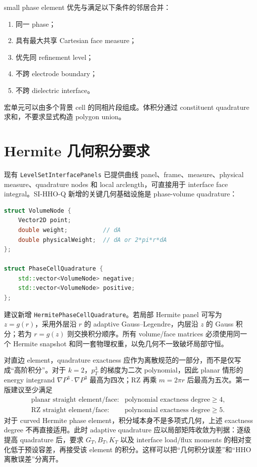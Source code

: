\documentclass[UTF8,a4paper,11pt]{ctexart}
\begin{document}
small phase element 优先与满足以下条件的邻居合并：
\begin{enumerate}[label=(\roman*)]
  \item 同一 phase；
  \item 具有最大共享 Cartesian face measure；
  \item 优先同 refinement level；
  \item 不跨 electrode boundary；
  \item 不跨 dielectric interface。
\end{enumerate}
宏单元可以由多个背景 cell 的同相片段组成。体积分通过 constituent quadrature 求和，不要求显式构造 polygon union。

\section{Hermite 几何积分要求}

现有 \texttt{LevelSetInterfacePanels} 已提供曲线 panel、frame、measure、physical measure、quadrature nodes 和 local arclength，可直接用于 interface face integral。SI-HHO-Q 新增的关键几何基础设施是 phase-volume quadrature：
\begin{lstlisting}[language=C++]
struct VolumeNode {
    Vector2D point;
    double weight;          // dA
    double physicalWeight;  // dA or 2*pi*r*dA
};

struct PhaseCellQuadrature {
    std::vector<VolumeNode> negative;
    std::vector<VolumeNode> positive;
};
\end{lstlisting}
建议新增 \texttt{HermitePhaseCellQuadrature}。若局部 Hermite panel 可写为 \(z=g(r)\)，采用外层沿 \(r\) 的 adaptive Gauss--Legendre，内层沿 \(z\) 的 Gauss 积分；若为 \(r=g(z)\) 则交换积分顺序。所有 volume/face matrices 必须使用同一个 Hermite snapshot 和同一套物理权重，以免几何不一致破坏局部守恒。

对直边 element，quadrature exactness 应作为离散规范的一部分，而不是仅写成“高阶积分”。对于 \(k=2\)，\(p_T^3\) 的梯度为二次 polynomial，因此 planar 情形的 energy integrand \(\nabla P^3\cdot\nabla P^3\) 最高为四次；RZ 再乘 \(m=2\pi r\) 后最高为五次。第一版建议至少满足
\[
\boxed{
\begin{array}{ll}
\text{planar straight element/face:} & \text{polynomial exactness degree}\ge4,\\
\text{RZ straight element/face:} & \text{polynomial exactness degree}\ge5.
\end{array}}
\]
对于 curved Hermite phase element，积分域本身不是多项式几何，上述 exactness degree 不再直接适用。此时 adaptive quadrature 应以局部矩阵收敛为判据：逐级提高 quadrature 后，要求 \(G_T,B_T,K_T\) 以及 interface load/flux moments 的相对变化低于预设容差，再接受该 element 的积分。这样可以把“几何积分误差”和“HHO 离散误差”分离开。
\end{document}
